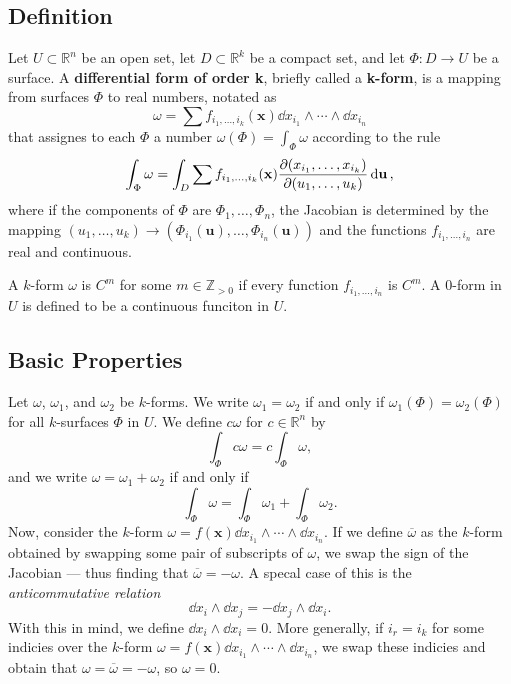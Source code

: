 \documentclass[11pt]{article}
\renewcommand{\vec}[1]{\mathbf{#1}}
\begin{document}
\subsection{Definition}

Let $U \subset \mathbb{R}^{n}$ be an open set, let $D \subset \mathbb{R}^{k}$ be a compact set, and let $\Phi : D \to U$ be a surface. A \textbf{differential form of order k}, briefly called a \textbf{k-form}, is a mapping from surfaces $\Phi$ to real numbers, notated as
\[
	\omega = \sum f_{i_{1}, \ldots, i_{k}}(\vec{x}) \dd{x_{i_{1}}} \wedge \cdots \wedge \dd{x_{i_{n}}}
\]
that assignes to each $\Phi$ a number $\omega(\Phi) = \int_{\Phi} \omega$ according to the rule
\[
	\int_{\Phi} \omega = \int_{D} \sum f_{i_{1}, \ldots, i_{k}}(\vec{x}) \pdv{(x_{i_{1}}, \ldots, x_{i_{k}})}{(u_{1}, \ldots, u_{k})} \dd{\vec{u}},
\]
where if the components of $\Phi$ are $\Phi_{1}, \ldots, \Phi_{n}$, the Jacobian is determined by the mapping $(u_{1}, \ldots, u_{k}) \to (\Phi_{i_{1}} (\vec{u}), \ldots, \Phi_{i_{n}} (\vec{u}))$ and the functions $f_{i_{1}, \ldots, i_{n}}$ are real and continuous.

A $k$-form $\omega$ is $C^{m}$ for some $m \in \mathbb{Z}_{> 0} $ if every function $f_{i_{1}, \ldots, i_{n}}$ is $C^{m}$. A $0$-form in $U$ is defined to be a continuous funciton in $U$.



\subsection{Basic Properties}

Let $\omega$, $\omega_{1}$, and $\omega_{2}$ be $k$-forms. We write $\omega_{1} = \omega_{2}$ if and only if $\omega_{1}(\Phi) = \omega_{2}(\Phi)$ for all $k$-surfaces $\Phi$ in $U$. We define $c \omega$ for $c \in \mathbb{R}^{n}$ by
\[
	\int_{\Phi} c \omega = c \int_{\Phi} \omega,
\]
and we write $\omega = \omega_{1} + \omega_{2}$ if and only if
\[
	\int_{\Phi} \omega = \int_{\Phi} \omega_{1} + \int_{\Phi} \omega_{2}.
\]
Now, consider the $k$-form $\omega = f(\vec{x}) \dd{x_{i_{1}}} \wedge \cdots \wedge \dd{x_{i_{n}}}$. If we define $\overline{\omega}$ as the $k$-form obtained by swapping some pair of subscripts of $\omega$, we swap the sign of the Jacobian --- thus finding that $\overline{\omega} = -\omega$. A specal case of this is the \textit{anticommutative relation}
\[
	\dd{x_{i}} \wedge \dd{x_{j}} = - \dd{x_{j}} \wedge \dd{x_{i}}.
\]
With this in mind, we define $\dd{x_{i}} \wedge \dd{x_{i}} = 0$. More generally, if $i_{r} = i_{k}$ for some indicies over the $k$-form $\omega = f(\vec{x}) \dd{x_{i_{1}}} \wedge \cdots \wedge \dd{x_{i_{n}}}$, we swap these indicies and obtain that $\omega = \overline{\omega} = - \omega$, so $\omega = 0$.
\end{document}
